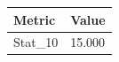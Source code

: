 \begin{tabular}{ll}
\toprule
Metric & Value \\
\midrule
Stat\_10 & 15.000 \\
\bottomrule
\end{tabular}